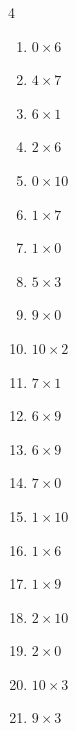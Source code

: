 \begin{multicols}{4}
\begin{enumerate}
  \item $0\times 6$
        \phantom{$=0$}

  \item $4\times 7$
        \phantom{$=28$}

  \item $6\times 1$
        \phantom{$=6$}

  \item $2\times 6$
        \phantom{$=12$}

  \item $0\times 10$
        \phantom{$=0$}

\columnbreak %

  \item $1\times 7$
        \phantom{$=7$}

  \item $1\times 0$
        \phantom{$=0$}

  \item $5\times 3$
        \phantom{$=15$}

  \item $9\times 0$
        \phantom{$=0$}

  \item $10\times 2$
        \phantom{$=20$}

  \item $7\times 1$
        \phantom{$=7$}

  \item $6\times 9$
        \phantom{$=54$}

  \item $6\times 9$
        \phantom{$=54$}

  \item $7\times 0$
        \phantom{$=0$}

  \item $1\times 10$
        \phantom{$=10$}

  \item $1\times 6$
        \phantom{$=6$}

  \item $1\times 9$
        \phantom{$=9$}

  \item $2\times 10$
        \phantom{$=20$}

  \item $2\times 0$
        \phantom{$=0$}

  \item $10\times 3$
        \phantom{$=30$}

  \item $9\times 3$
        \phantom{$=27$}


\end{enumerate}
\end{multicols}
